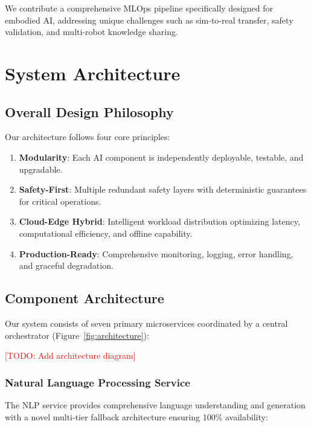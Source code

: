 \documentclass[conference]{IEEEtran}
\newcommand{\todo}[1]{\textcolor{red}{[TODO: #1]}}
\begin{document}
We contribute a comprehensive MLOps pipeline specifically designed for embodied AI, addressing unique challenges such as sim-to-real transfer, safety validation, and multi-robot knowledge sharing.

\section{System Architecture}
\label{sec:architecture}

\subsection{Overall Design Philosophy}

Our architecture follows four core principles:

\begin{enumerate}
    \item \textbf{Modularity}: Each AI component is independently deployable, testable, and upgradable.
    \item \textbf{Safety-First}: Multiple redundant safety layers with deterministic guarantees for critical operations.
    \item \textbf{Cloud-Edge Hybrid}: Intelligent workload distribution optimizing latency, computational efficiency, and offline capability.
    \item \textbf{Production-Ready}: Comprehensive monitoring, logging, error handling, and graceful degradation.
\end{enumerate}

\subsection{Component Architecture}

Our system consists of seven primary microservices coordinated by a central orchestrator (Figure~\ref{fig:architecture}):

\todo{Add architecture diagram}

\subsubsection{Natural Language Processing Service}

The NLP service provides comprehensive language understanding and generation with a novel multi-tier fallback architecture ensuring 100\% availability:
\end{document}
